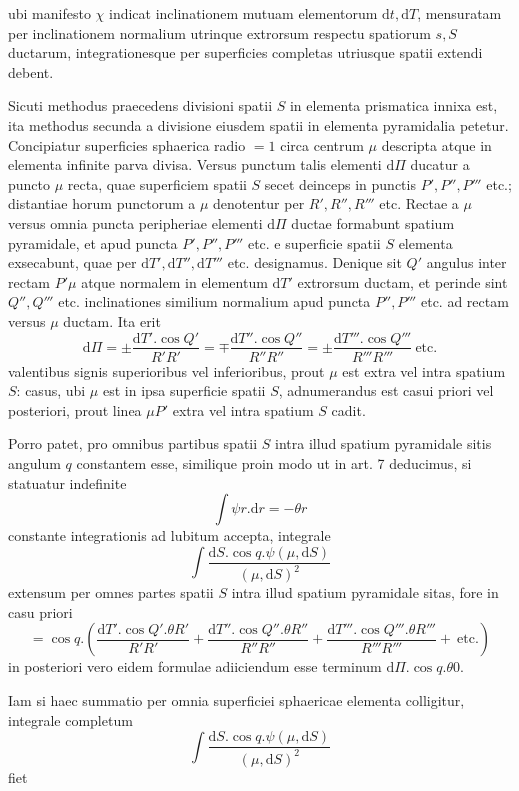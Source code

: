 ubi manifesto $\chi$ indicat inclinationem mutuam elementorum $\mathrm{d}t,\mathrm{d}T$, mensuratam per inclinationem normalium utrinque extrorsum respectu spatiorum $s,S$ ductarum, integrationesque per superficies completas utriusque spatii extendi debent.

Sicuti methodus praecedens divisioni spatii $S$ in elementa prismatica innixa est, ita methodus secunda a divisione eiusdem spatii in elementa pyramidalia petetur. Concipiatur superficies sphaerica radio $=1$ circa centrum $\mu$ descripta atque in elementa infinite parva divisa. Versus punctum talis elementi $\mathrm{d}\Pi$ ducatur a puncto $\mu$ recta, quae superficiem spatii $S$ secet deinceps in punctis $P',P'',P'''$ etc.; distantiae horum punctorum a $\mu$ denotentur per $R',R'',R'''$ etc. Rectae a $\mu$ versus omnia puncta peripheriae elementi $\mathrm{d}\Pi$ ductae formabunt spatium pyramidale, et apud puncta $P',P'',P'''$ etc. e superficie spatii $S$ elementa exsecabunt, quae per $\mathrm{d}T',\mathrm{d}T'',\mathrm{d}T'''$ etc. designamus. Denique sit $Q'$ angulus inter rectam $P'\mu$ atque normalem in elementum $\mathrm{d}T'$ extrorsum ductam, et perinde sint $Q'',Q'''$ etc. inclinationes similium normalium apud puncta $P'',P'''$ etc. ad rectam versus $\mu$ ductam. Ita erit
\[
\mathrm{d}\Pi=\pm\frac{\mathrm{d}T'.\cos Q'}{R'R'}=\mp\frac{\mathrm{d}T''.\cos Q''}{R''R''}=\pm\frac{\mathrm{d}T'''.\cos Q'''}{R'''R'''}\ \text{etc.}
\]
valentibus signis superioribus vel inferioribus, prout $\mu$ est extra vel intra spatium $S$: casus, ubi $\mu$ est in ipsa superficie spatii $S$, adnumerandus est casui priori vel posteriori, prout linea $\mu P'$ extra vel intra spatium $S$ cadit.

Porro patet, pro omnibus partibus spatii $S$ intra illud spatium pyramidale sitis angulum $q$ constantem esse, similique proin modo ut in art. 7 deducimus, si statuatur indefinite
\[
\int\psi r.\mathrm{d}r=-\theta r
\]
constante integrationis ad lubitum accepta, integrale
\[
\int\frac{\mathrm{d}S.\cos q.\psi(\mu,\mathrm{d}S)}{(\mu,\mathrm{d}S)^2}
\]
extensum per omnes partes spatii $S$ intra illud spatium pyramidale sitas, fore in casu priori
\[
=\cos q.\left(\frac{\mathrm{d}T'.\cos Q'.\theta R'}{R'R'}+\frac{\mathrm{d}T''.\cos Q''.\theta R''}{R''R''}+\frac{\mathrm{d}T'''.\cos Q'''.\theta R'''}{R'''R'''}+\ \text{etc.}\right)
\]
in posteriori vero eidem formulae adiiciendum esse terminum $\mathrm{d}\Pi.\cos q.\theta0$.

Iam si haec summatio per omnia superficiei sphaericae elementa colligitur, integrale completum
\[
\int\frac{\mathrm{d}S.\cos q.\psi(\mu,\mathrm{d}S)}{(\mu,\mathrm{d}S)^2}
\]
fiet

